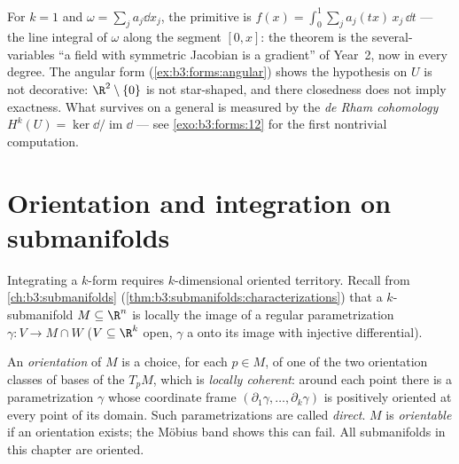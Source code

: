 \begin{remark}
For $k = 1$ and $\omega = \sum_j a_j\dd x_j$, the primitive
is $f(x) = \int_0^1\sum_ja_j(tx)\,x_j\,\dd t$ --- the line
integral of $\omega$ along the segment $[0, x]$: the theorem
is the several-variables ``a field with symmetric Jacobian
is a gradient'' of Year~2, now in every degree. The angular
form (\cref{ex:b3:forms:angular}) shows the hypothesis on
$U$ is not decorative: $\R^2\setminus\{0\}$ is not
star-shaped, and there closedness does not imply exactness.
What survives on a general  is measured by the
\emph{de Rham cohomology} $H^k(U) =
\ker\dd/\operatorname{im}\dd$ --- see
\cref{exo:b3:forms:12} for the first nontrivial computation.
\end{remark}

\section{Orientation and integration on submanifolds}

Integrating a $k$-form requires $k$-dimensional oriented
territory. Recall from \cref{ch:b3:submanifolds}
(\cref{thm:b3:submanifolds:characterizations}) that a
$k$-submanifold $M \subseteq \R^n$ is locally the image of a
regular parametrization $\gamma\colon V \to M \cap W$ ($V
\subseteq \R^k$ open, $\gamma$ a  onto its image
with injective differential).

\begin{definition}\label{def:b3:forms:orientation}
An \emph{orientation} of $M$ is a choice,
for each $p \in M$, of one of the two orientation classes of
bases of the  $T_pM$, which is \emph{locally
coherent}: around each point there is a parametrization
$\gamma$ whose coordinate frame $(\partial_1\gamma, \dots,
\partial_k\gamma)$ is positively oriented at every point of
its domain. Such parametrizations are called \emph{direct}.
$M$ is \emph{orientable} if an orientation exists; the
M\"obius band shows this can fail. All submanifolds in this
chapter are oriented.
\end{definition}

